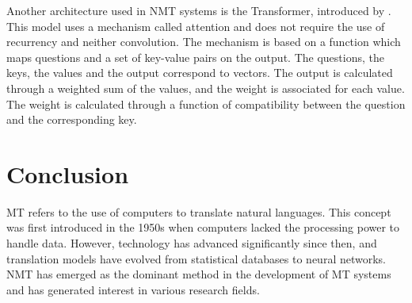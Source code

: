 \documentclass[a4paper]{article}
\begin{document}
    Another architecture used in NMT systems is the Transformer, introduced 
    by \cite{vaswani:2017attention}. This model uses a mechanism called attention 
    and does not require the use of recurrency and neither convolution. 
    The mechanism is based on a function which maps questions and a set of 
    key-value pairs on the output.
    The questions, the keys, the values and the output correspond to vectors.
    The output is calculated through a weighted sum of the values, and the 
    weight is associated for each value. The weight is calculated through
    a function of compatibility between the question and the corresponding 
    key.

    \section*{Conclusion}

    MT refers to the use of computers to translate natural languages. 
    This concept was first introduced in the 1950s when computers 
    lacked the processing power to handle data. 
    However, technology has advanced significantly since then, and 
    translation models have evolved from statistical databases to 
    neural networks.
    NMT has emerged as the dominant method in the development of MT 
    systems and has generated interest in various research fields.



 
\end{document}
